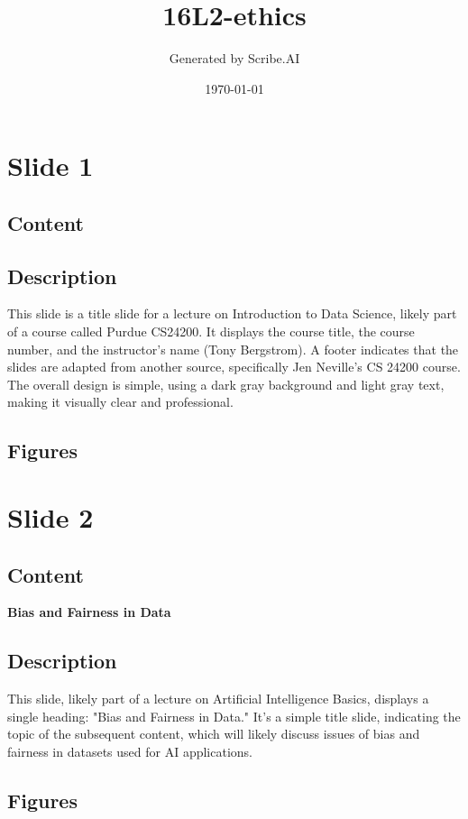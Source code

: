 \documentclass{article}%
\title{16L2{-}ethics}%
\author{Generated by Scribe.AI}%
\date{\today}%
\begin{document}
%
\normalsize%
\maketitle%
\section{Slide 1}%
\label{sec:Slide1}%
\subsection{Content}%
%
\subsection{Description}%
This slide is a title slide for a lecture on Introduction to Data Science, likely part of a course called Purdue CS24200.  It displays the course title, the course number, and the instructor's name (Tony Bergstrom).  A footer indicates that the slides are adapted from another source, specifically Jen Neville's CS 24200 course.  The overall design is simple, using a dark gray background and light gray text, making it visually clear and professional.%
\subsection{Figures}%
\begin{figure}[H]%
\centering%
\end{figure}

%
\newpage%
\section{Slide 2}%
\label{sec:Slide2}%
\subsection{Content}%

\textbf{Bias and Fairness in Data}
%
\subsection{Description}%
This slide, likely part of a lecture on Artificial Intelligence Basics, displays a single heading: "Bias and Fairness in Data."  It's a simple title slide, indicating the topic of the subsequent content, which will likely discuss issues of bias and fairness in datasets used for AI applications.%
\subsection{Figures}%
\begin{figure}[H]%
\centering%
\end{figure}
\end{document}
